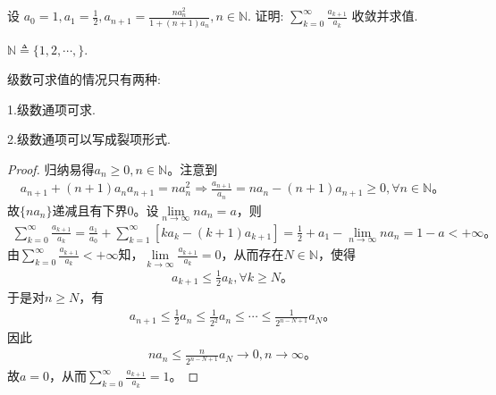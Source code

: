 \documentclass[../../main.tex]{subfiles}%
\begin{document}
\begin{example}
设 \( a_0 = 1, a_1 = \frac{1}{2}, a_{n+1} = \frac{n a_n^2}{1 + (n + 1) a_n}, n \in \mathbb{N} \). 证明: \( \sum_{k=0}^{\infty} \frac{a_{k+1}}{a_k} \) 收敛并求值.
\end{example}
\begin{remark}
$\mathbb{N}\triangleq \{1,2,\cdots,\}$.
\end{remark}
\begin{remark}
级数可求值的情况只有两种:

1.级数通项可求.

2.级数通项可以写成裂项形式.
\end{remark}
\begin{proof}

归纳易得$a_n\geqslant 0,n\in \mathbb{N}$。注意到
\begin{align*}
a_{n+1}+\left( n+1 \right) a_na_{n+1}=na_{n}^{2}\Longrightarrow \frac{a_{n+1}}{a_n}=na_n-\left( n+1 \right) a_{n+1}\geqslant 0,\forall n\in \mathbb{N}。
\end{align*}
故$\{ na_n \}$递减且有下界$0$。设$\lim\limits_{n\rightarrow \infty}na_n=a$，则
\begin{align*}
\sum_{k=0}^{\infty}{\frac{a_{k+1}}{a_k}}=\frac{a_1}{a_0}+\sum_{k=1}^{\infty}{\left[ ka_k-\left( k+1 \right) a_{k+1} \right]}=\frac{1}{2}+a_1-\lim\limits_{n\rightarrow \infty}na_n=1-a<+\infty。
\end{align*}
由$\sum_{k=0}^{\infty}{\frac{a_{k+1}}{a_k}}<+\infty$知，$\lim\limits_{k\rightarrow \infty}\frac{a_{k+1}}{a_k}=0$，从而存在$N\in \mathbb{N}$，使得
\begin{align*}
a_{k+1}\leqslant \frac{1}{2}a_k,\forall k\geqslant N。
\end{align*}
于是对$n\geqslant N$，有
\begin{align*}
a_{n+1}\leqslant \frac{1}{2}a_n\leqslant \frac{1}{2^2}a_n\leqslant \cdots \leqslant \frac{1}{2^{n-N+1}}a_N。
\end{align*}
因此
\begin{align*}
na_n\leqslant \frac{n}{2^{n-N+1}}a_N\rightarrow 0,n\rightarrow \infty。
\end{align*}
故$a=0$，从而$\sum_{k=0}^{\infty}{\frac{a_{k+1}}{a_k}}=1$。

\end{proof}
\end{document}
